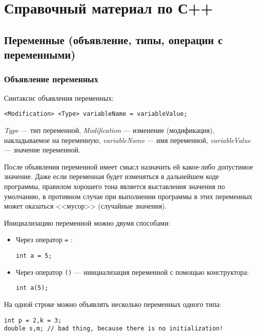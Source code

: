 \section{Справочный материал по С++}

\subsection{Переменные (объявление, типы, операции с переменными)}

\subsubsection{Объявление переменных}
Синтаксис объявления переменных:

\lstinline|<Modification> <Type> variableName = variableValue;|

\textit{Type} --- тип переменной, \textit{Modification} --- изменение (модификация), накладываемое на переменную, \textit{variableName} --- имя переменной, \textit{variableValue} --- значение переменной.

После объявления переменной имеет смысл назначить ей какое-либо допустимое значение. Даже если переменная будет изменяться в дальнейшем коде программы, правилом хорошего тона является выставления значения по умолчанию, в противном случае при выполнении программы в этих переменных может оказаться <<мусор>> (случайные значения).

Инициализацию переменной можно двумя способами:
\begin{itemize}
    \item Через оператор \lstinline{=} :
        
        \lstinline|int a = 5;|
    \item Через оператор \lstinline{()} --- инициализация переменной с помощью конструктора:
        
         \lstinline|int a(5);|
\end{itemize}

На одной строке можно объявлять несколько переменных одного типа:
\begin{lstlisting}
int p = 2,k = 3;
double s,m; // bad thing, because there is no initialization!
\end{lstlisting}

